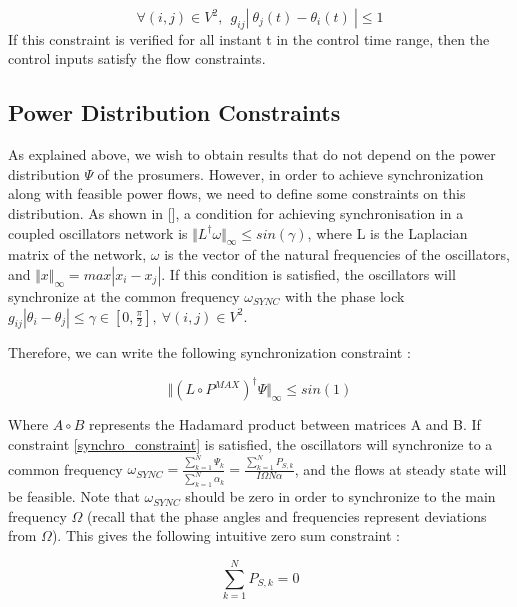 \documentclass[conference]{IEEEtran}
\begin{document}
\begin{equation}
\forall (i,j) \in V^2,\ \ g_{ij} \left|\ \theta_j(t) - \theta_i(t)\ \right| \leq 1
\end{equation}
If this constraint is verified for all instant t in the control time range, then the control inputs satisfy the flow constraints. 


\subsection{Power Distribution Constraints}
As explained above, we wish to obtain results that do not depend on the power distribution $ \Psi $ of the prosumers. However, in order to achieve synchronization along with feasible power flows, we need to define some constraints on this distribution. As shown in [], a condition for achieving synchronisation in a coupled oscillators network is $ \Vert L^{\dagger}\omega \Vert_{\infty} \leq sin(\gamma) $, where L is the Laplacian matrix of the network, $ \omega $ is the vector of the natural frequencies of the oscillators, and $ \Vert x \Vert_{\infty} = max \left| x_i - x_j \right| $. If this condition is satisfied, the oscillators will synchronize at the common frequency $ \omega_{SYNC} $ with the phase lock $ g_{ij}\left| \theta_i - \theta_j \right| \leq    \gamma \in[0,\frac{\pi}{2}],\ \forall (i,j) \in V^2 $.

Therefore, we can write the following synchronization constraint :

\begin{equation}
\label{synchro_constraint}
\Vert \left( L \circ P^{MAX} \right)^{\dagger} \Psi \Vert_{\infty} \leq sin(1)
\end{equation}

Where $ A \circ B $ represents the Hadamard product between matrices A and B. If constraint \ref{synchro_constraint} is satisfied, the oscillators will synchronize to a common frequency $ \omega_{SYNC} = \frac{\sum_{k=1}^{N}\Psi_k}{\sum_{k=1}^{N}\alpha_k} = \frac{\sum_{k=1}^{N}P_{S,k}}{I\Omega N \alpha}$, and the flows at steady state will be feasible. Note that $\omega_{SYNC} $ should be zero in order to synchronize to the main frequency $\Omega$ (recall that the phase angles and frequencies represent deviations from $ \Omega$). This gives the following intuitive zero sum constraint :

\begin{equation}
\label{zero_sum_constraint}
\sum_{k=1}^{N} P_{S,k} = 0
\end{equation}
\end{document}
